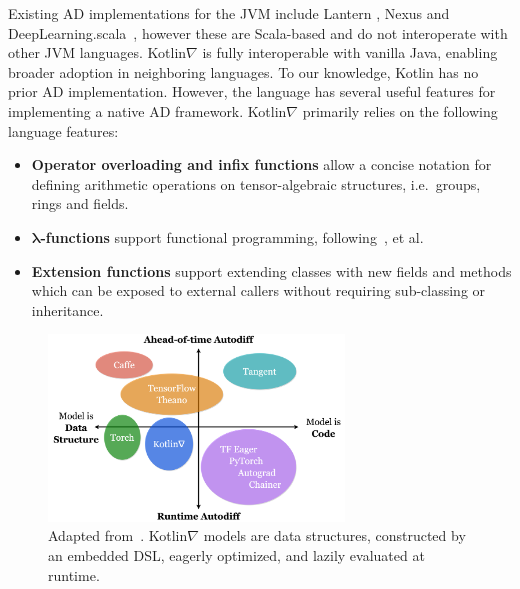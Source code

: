 \documentclass[12pt,initial,twoside,maitrise]{dms}
\numberwithin{equation}{section}
\numberwithin{table}{chapter}
\numberwithin{figure}{chapter}
\begin{document}
Existing AD implementations for the JVM include Lantern \citep{wang2018demystifying}, Nexus \citep{chen2017typesafe} and DeepLearning.scala~\citep{dl4s}, however these are Scala-based and do not interoperate with other JVM languages. Kotlin$\nabla$ is fully interoperable with vanilla Java, enabling broader adoption in neighboring languages. To our knowledge, Kotlin has no prior AD implementation. However, the language has several useful features for implementing a native AD framework. Kotlin$\nabla$ primarily relies on the following language features:

\begin{itemize}
\item \textbf{Operator overloading and infix functions} allow a concise notation for defining arithmetic operations on tensor-algebraic structures, i.e.\ groups, rings and fields.
\item \textbf{$\mathbf{\lambda}$-functions} support functional programming, following~\citet{pearlmutter2008reverse, pearlmutter2008using, siskind2008nesting, elliott2009beautiful, elliott2018simple}, et al.
\item \textbf{Extension functions} support extending classes with new fields and methods which can be exposed to external callers without requiring sub-classing or inheritance.
\end{itemize}

\begin{figure}
    \centering
    \includegraphics[width=0.70\textwidth]{kotlingrad_diagram.png}
    \caption{Adapted from~\citet{van2018tangent}. Kotlin$\nabla$ models are data structures, constructed by an embedded DSL, eagerly optimized, and lazily evaluated at runtime.}
    \label{fig:kotlingrad_digram}
\end{figure}
\end{document}
